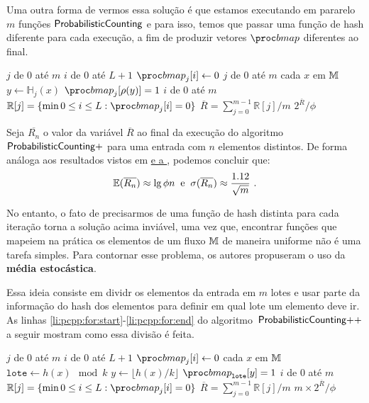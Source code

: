 Uma outra forma de vermos essa solução é que estamos executando em pararelo $m$ funções $\textsf{ProbabilisticCounting}$ e para isso, temos que 
passar uma função de hash diferente para cada execução, a fim de produzir vetores $\bitmap$ diferentes ao final.

\begin{codebox}
  \li \For $j$ de $0$ até $m$
      \Do
  \li    \For $i$ de $0$ até $L + 1$
          \Do
  \li       $\bitmap_{j}[i] \gets 0$
          \End
      \End
  \li \For $j$ de $0$ até $m$
      \Do
  \li    \For cada $x$ em $\mathbb{M}$
          \Do
  \li       $y \gets \mathbb{H}_{j}(x)$
  \li       $\bitmap_j[\rho(y)] = 1$
          \End
      \End
  \li \For $i$ de $0$ até $m$
      \Do
  \li    $\mathbb{R}[j] = \{ \min 0 \leq i \leq L: \bitmap_{j}[i] = 0 \}$
      \End
  \li $\overline{R} = \sum_{j=0}^{m-1} \mathbb{R}[j] / m$
  \li \Return $2^{\overline{R}}/\phi$
  \End
\end{codebox}

Seja $\overline{R_n}$ o valor da variável $\overline{R}$ ao final da execução do algoritmo~$\textsf{ProbabilisticCounting}{+}$ para uma
entrada com $n$ elementos distintos. De forma análoga aos resultados vistos em \hyperref[sec:morris:plus]{ 
e a }, podemos concluir que:
\[ \Ebb(\overline{R_n}) \approx \lg \phi n   \; \; \text{e}  \; \; \sigma(\overline{R_n}) \approx \frac{1.12}{\sqrt{m}} \ . \]

No entanto, o fato de precisarmos de uma função de hash distinta para cada iteração torna a solução acima inviável, uma 
vez que, encontrar funções que mapeiem na prática os elementos de um fluxo $\mathbb{M}$ de maneira uniforme não é uma 
tarefa simples. Para contornar esse problema, os autores propuseram o uso da \textbf{média estocástica}.

Essa ideia consiste em dividr os elementos da entrada em $m$ lotes e usar parte da informação do hash dos elementos para 
definir em qual lote um elemento deve ir. As linhas \ref{li:pcpp:for:start}-\ref{li:pcpp:for:end} do algoritmo~$\textsf{ProbabilisticCounting{++}}$ 
a seguir mostram como essa divisão é feita.

\begin{codebox}
  \li \For $j$ de $0$ até $m$
      \Do
  \li    \For $i$ de $0$ até $L + 1$
          \Do
  \li       $\bitmap_{j}[i] \gets 0$
          \End
      \End
  \li \For cada $x$ em $\mathbb{M}$                                                         \label{li:pcpp:for:start}
      \Do
  \li   $\texttt{lote} \gets h(x) \mod k$
  \li   $y \gets \lfloor h(x) / k \rfloor$
  \li   $\bitmap_{\texttt{lote}}[y] = 1$                                              \label{li:pcpp:for:end}
      \End
  \li \For $i$ de $0$ até $m$
      \Do
  \li    $\mathbb{R}[j] = \{ \min 0 \leq i \leq L: \bitmap_{j}[i] = 0 \}$             \label{li:pcpp:rmin}
      \End
  \li $\overline{R} = \sum_{j=0}^{m-1} \mathbb{R}[j] / m$
  \li \Return $m \times 2^{\overline{R}}/\phi$
  \End
\end{codebox}

